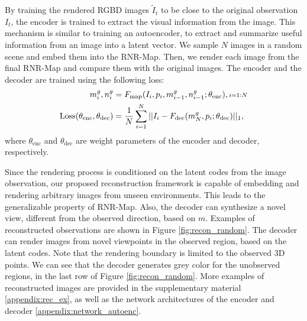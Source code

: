 \documentclass[10pt,twocolumn,letterpaper]{article}
\def\proposed{RNR-Map\xspace}
\begin{document}
By training the rendered RGBD images $\tilde{I}_t$ to be close to the original observation $I_t$, the encoder is trained to extract the visual information from the image. 
%
This mechanism is similar to training an autoencoder, to extract and summarize useful information from an image into a latent vector.
%
We sample $N$ images in a random scene and embed them into the \proposed .
%
Then, we render each image from the final \proposed  and compare them with the original images.
%
The encoder and the decoder are trained using the following loss:
\begin{align} \label{eq:recon}
\small
    m^g_i, n^g_i &= F_\mathrm{map}(I_i, p_i, m^g_{i-1}, n^g_{i-1}; \theta_\mathrm{enc}), {\scriptstyle{i=1:N}} \notag \\
    \mathrm{Loss}(\theta_\mathrm{enc}, \theta_\mathrm{dec}) &= {{1}\over{N}} \sum_{i=1}^N ||I_i-F_\mathrm{dec}(m_N^g,p_i; \theta_\mathrm{dec})||_1,  
\end{align}
where $\theta_\mathrm{enc}$ and $\theta_\mathrm{dec}$ are weight parameters of the encoder and decoder, respectively.

Since the rendering process is conditioned on the latent codes from the image observation, our proposed reconstruction framework is capable of embedding and rendering arbitrary images from unseen environments. This leads to the generalizable property of RNR-Map. Also, the decoder can synthesize a novel view, different from the observed direction, based on $m$. 
%
Examples of reconstructed observations are shown in Figure \ref{fig:recon_random}.
%
The decoder can render images from novel viewpoints in the observed region, based on the latent codes. 
%
Note that the rendering boundary is limited to the observed 3D points.
%
We can see that the decoder generates grey color for the unobserved regions, in the last row of Figure \ref{fig:recon_random}.
%
More examples of reconstructed images are provided in the supplementary material \ref{appendix:rec_ex}, as well as the network architectures of the encoder and decoder \ref{appendix:network_autoenc}.


\vspace{-0.4cm}
\end{document}
